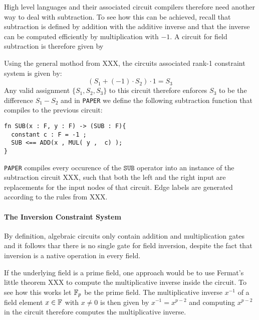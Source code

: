 High level languages and their associated circuit compilers therefore need another way to deal with subtraction. To see how this can be achieved, recall that subtraction is defined by addition with the additive inverse and that the inverse can be computed efficiently by multiplication with $-1$. A circuit for field subtraction is therefore given by
\begin{center}
\end{center}
Using the general mothod from XXX, the circuits associated rank-1 constraint system is given by:
\begin{equation}
\left(S_1 + (-1)\cdot S_2\right)\cdot 1 = S_3
\end{equation}
Any valid assignment $\{S_1,S_2, S_3\}$ to this circuit therefore enforces $S_3$ to be the difference $S_1- S_2$ and in \texttt{PAPER} we define the following subtraction function that compiles to the previous circuit:
\begin{lstlisting}
fn SUB(x : F, y : F) -> (SUB : F){
  constant c : F = -1 ;
  SUB <== ADD(x , MUL( y ,  c) );
}
\end{lstlisting}
\texttt{PAPER} compiles every occurence of the $\mathtt{SUB}$ operator into an instance of the subtraction circuit XXX, such that both the left and the right input are replacements for the input nodes of that circuit. Edge labels are generated according to the rules from XXX.
\paragraph{The Inversion Constraint System} By definition, algebraic circuits only contain addition and multiplication gates and it follows thar there is no single gate for field inversion, despite the fact that inversion is a native operation in every field. 

If the underlying field is a prime field, one approach would be to use Fermat's little theorem XXX to compute the multiplicative inverse inside the circuit. To see how this works let $\mathbb{F}_p$ be the prime field. The multiplicative inverse $x^{-1}$ of a field element $x\in\mathbb{F}$ with $x\neq 0$ is then given by $x^{-1}= x^{p-2}$ and computing $x^{p-2}$ in the circuit therefore computes the multiplicative inverse. 

